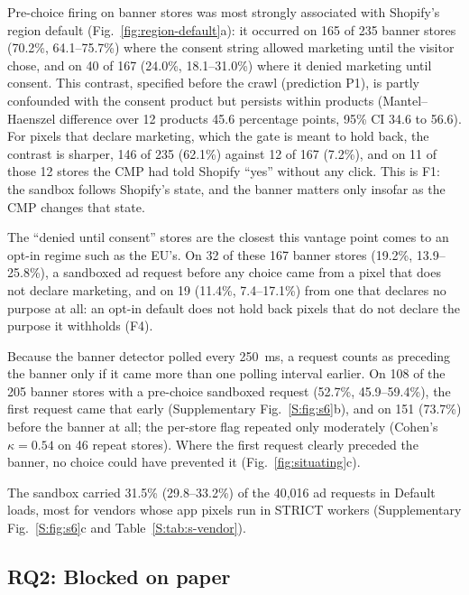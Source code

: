 Pre-choice firing on banner stores was most strongly associated with Shopify's region default (Fig.~\ref{fig:region-default}a): it occurred on 165 of 235 banner stores (70.2\%, 64.1--75.7\%) where the consent string allowed marketing until the visitor chose, and on 40 of 167 (24.0\%, 18.1--31.0\%) where it denied marketing until consent. This contrast, specified before the crawl (prediction P1), is partly confounded with the consent product but persists within products (Mantel--Haenszel difference over 12 products 45.6 percentage points, 95\% CI 34.6 to 56.6). For pixels that declare marketing, which the gate is meant to hold back, the contrast is sharper, 146 of 235 (62.1\%) against 12 of 167 (7.2\%), and on 11 of those 12 stores the CMP had told Shopify ``yes'' without any click. This is F1: the sandbox follows Shopify's state, and the banner matters only insofar as the CMP changes that state.

The ``denied until consent'' stores are the closest this vantage point comes to an opt-in regime such as the EU's. On 32 of these 167 banner stores (19.2\%, 13.9--25.8\%), a sandboxed ad request before any choice came from a pixel that does not declare marketing, and on 19 (11.4\%, 7.4--17.1\%) from one that declares no purpose at all: an opt-in default does not hold back pixels that do not declare the purpose it withholds (F4).

Because the banner detector polled every 250~ms, a request counts as preceding the banner only if it came more than one polling interval earlier. On 108 of the 205 banner stores with a pre-choice sandboxed request (52.7\%, 45.9--59.4\%), the first request came that early (Supplementary Fig.~\ref*{S:fig:s6}b), and on 151 (73.7\%) before the banner at all; the per-store flag repeated only moderately (Cohen's $\kappa=0.54$ on 46 repeat stores). Where the first request clearly preceded the banner, no choice could have prevented it (Fig.~\ref{fig:situating}c).

The sandbox carried 31.5\% (29.8--33.2\%) of the 40,016 ad requests in Default loads, most for vendors whose app pixels run in STRICT workers (Supplementary Fig.~\ref*{S:fig:s6}c and Table~\ref*{S:tab:s-vendor}).

\subsection{RQ2: Blocked on paper}\label{sec:res-paper}

